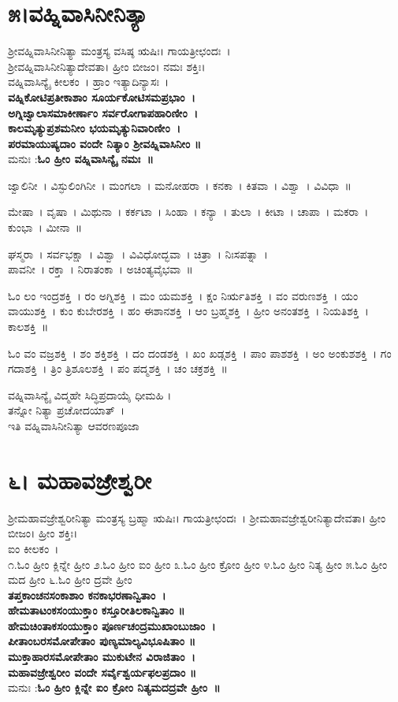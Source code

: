 \section{೫।ವಹ್ನಿವಾಸಿನೀನಿತ್ಯಾ}
ಶ್ರೀವಹ್ನಿವಾಸಿನೀನಿತ್ಯಾ ಮಂತ್ರಸ್ಯ ವಸಿಷ್ಠ ಋಷಿಃ। ಗಾಯತ್ರೀಛಂದಃ~।\\ ಶ್ರೀವಹ್ನಿವಾಸಿನೀನಿತ್ಯಾದೇವತಾ। ಹ್ರೀಂ ಬೀಜಂ। ನಮಃ ಶಕ್ತಿಃ।\\ ವಹ್ನಿವಾಸಿನ್ಯೈ ಕೀಲಕಂ~। ಹ್ರಾಂ ಇತ್ಯಾದಿನ್ಯಾಸಃ~।\\
{\bfseries ವಹ್ನಿಕೋಟಿಪ್ರತೀಕಾಶಾಂ ಸೂರ್ಯಕೋಟಿಸಮಪ್ರಭಾಂ~।\\
ಅಗ್ನಿಜ್ವಾಲಾಸಮಾಕೀರ್ಣಾಂ ಸರ್ವರೋಗಾಪಹಾರಿಣೀಂ~।\\
ಕಾಲಮೃತ್ಯುಪ್ರಶಮನೀಂ ಭಯಮೃತ್ಯುನಿವಾರಿಣೀಂ~।\\
ಪರಮಾಯುಷ್ಯದಾಂ ವಂದೇ ನಿತ್ಯಾಂ ಶ್ರೀವಹ್ನಿವಾಸಿನೀಂ ॥\\}
ಮನುಃ :{\bfseries ಓಂ ಹ್ರೀಂ ವಹ್ನಿವಾಸಿನ್ಯೈ ನಮಃ~॥}

ಜ್ವಾಲಿನೀ~। ವಿಸ್ಫುಲಿಂಗಿನೀ~। ಮಂಗಲಾ~। ಮನೋಹರಾ~। ಕನಕಾ~। ಕಿತವಾ~। ವಿಶ್ವಾ~। ವಿವಿಧಾ~॥

ಮೇಷಾ~। ವೃಷಾ~। ಮಿಥುನಾ~। ಕರ್ಕಟಾ~। ಸಿಂಹಾ~। ಕನ್ಯಾ~। ತುಲಾ~। ಕೀಟಾ~। ಚಾಪಾ~। ಮಕರಾ~। ಕುಂಭಾ~। ಮೀನಾ~॥ 

ಘಸ್ಮರಾ~। ಸರ್ವಭಕ್ಷಾ~। ವಿಶ್ವಾ~। ವಿವಿಧೋದ್ಭವಾ~। ಚಿತ್ರಾ~। ನಿಃಸಪತ್ನಾ~।\\ ಪಾವನೀ~। ರಕ್ತಾ~। ನಿರಾತಂಕಾ~। ಅಚಿಂತ್ಯವೈಭವಾ~॥

ಓಂ ಲಂ ಇಂದ್ರಶಕ್ತಿ~। ರಂ ಅಗ್ನಿಶಕ್ತಿ~। ಮಂ ಯಮಶಕ್ತಿ~। ಕ್ಷಂ ನಿರ್ಋತಿಶಕ್ತಿ~। ವಂ ವರುಣಶಕ್ತಿ~। ಯಂ ವಾಯುಶಕ್ತಿ~। ಕುಂ ಕುಬೇರಶಕ್ತಿ~। ಹಂ ಈಶಾನಶಕ್ತಿ~। ಆಂ ಬ್ರಹ್ಮಶಕ್ತಿ~। ಹ್ರೀಂ ಅನಂತಶಕ್ತಿ~। ನಿಯತಿಶಕ್ತಿ~। ಕಾಲಶಕ್ತಿ~॥ 

ಓಂ ವಂ ವಜ್ರಶಕ್ತಿ~। ಶಂ ಶಕ್ತಿಶಕ್ತಿ~। ದಂ ದಂಡಶಕ್ತಿ~। ಖಂ ಖಡ್ಗಶಕ್ತಿ~। ಪಾಂ ಪಾಶಶಕ್ತಿ~। ಅಂ ಅಂಕುಶಶಕ್ತಿ~। ಗಂ ಗದಾಶಕ್ತಿ~। ತ್ರಿಂ ತ್ರಿಶೂಲಶಕ್ತಿ~। ಪಂ ಪದ್ಮಶಕ್ತಿ~। ಚಂ ಚಕ್ರಶಕ್ತಿ~॥ 

ವಹ್ನಿವಾಸಿನ್ಯೈ ವಿದ್ಮಹೇ ಸಿದ್ಧಿಪ್ರದಾಯೈ ಧೀಮಹಿ ।\\ತನ್ನೋ ನಿತ್ಯಾ ಪ್ರಚೋದಯಾತ್~।\\
ಇತಿ ವಹ್ನಿವಾಸಿನೀನಿತ್ಯಾ ಆವರಣಪೂಜಾ
\section{೬। ಮಹಾವಜ್ರೇಶ್ವರೀ}
ಶ್ರೀಮಹಾವಜ್ರೇಶ್ವರೀನಿತ್ಯಾ ಮಂತ್ರಸ್ಯ ಬ್ರಹ್ಮಾ ಋಷಿಃ। ಗಾಯತ್ರೀಛಂದಃ~। ಶ್ರೀಮಹಾವಜ್ರೇಶ್ವರೀನಿತ್ಯಾದೇವತಾ। ಹ್ರೀಂ ಬೀಜಂ। ಹ್ರೀಂ ಶಕ್ತಿಃ।\\
ಐಂ ಕೀಲಕಂ~।\\
೧.ಓಂ ಹ್ರೀಂ ಕ್ಲಿನ್ನೇ ಹ್ರೀಂ ೨.ಓಂ ಹ್ರೀಂ ಐಂ ಹ್ರೀಂ ೩.ಓಂ ಹ್ರೀಂ ಕ್ರೋಂ ಹ್ರೀಂ ೪.ಓಂ ಹ್ರೀಂ ನಿತ್ಯ ಹ್ರೀಂ ೫.ಓಂ ಹ್ರೀಂ ಮದ ಹ್ರೀಂ ೬.ಓಂ ಹ್ರೀಂ ದ್ರವೇ ಹ್ರೀಂ \\
{\bfseries ತಪ್ತಕಾಂಚನಸಂಕಾಶಾಂ ಕನಕಾಭರಣಾನ್ವಿತಾಂ~।\\
ಹೇಮತಾಟಂಕಸಂಯುಕ್ತಾಂ ಕಸ್ತೂರೀತಿಲಕಾನ್ವಿತಾಂ ॥\\
ಹೇಮಚಿಂತಾಕಸಂಯುಕ್ತಾಂ ಪೂರ್ಣಚಂದ್ರಮುಖಾಂಬುಜಾಂ~।\\
ಪೀತಾಂಬರಸಮೋಪೇತಾಂ ಪುಣ್ಯಮಾಲ್ಯವಿಭೂಷಿತಾಂ ॥\\
ಮುಕ್ತಾಹಾರಸಮೋಪೇತಾಂ ಮುಕುಟೇನ ವಿರಾಜಿತಾಂ~।\\
ಮಹಾವಜ್ರೇಶ್ವರೀಂ ವಂದೇ ಸರ್ವೈಶ್ವರ್ಯಫಲಪ್ರದಾಂ ॥\\}
ಮನುಃ :{\bfseries ಓಂ ಹ್ರೀಂ ಕ್ಲಿನ್ನೇ ಐಂ ಕ್ರೋಂ ನಿತ್ಯಮದದ್ರವೇ ಹ್ರೀಂ~॥}

